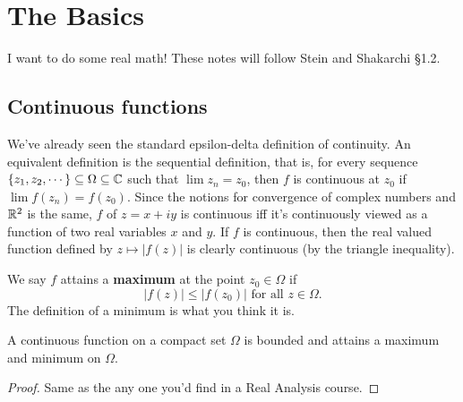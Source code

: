 \section{The Basics}
I want to do some real math! These notes will follow Stein and Shakarchi \S 1.2.
\subsection{Continuous functions}
We've already seen the standard epsilon-delta definition of continuity. An equivalent definition is the sequential definition, that is, for every sequence $\{z_1,z_2,\cdots\} \subseteq \Omega \subseteq \mathbb{C}$ such that $\lim z_n=z_0$, then $f$ is continuous at $z_0$ if $\lim f(z_n)=f(z_0)$. Since the notions for convergence of complex numbers and $\mathbb{R}^2$ is the same, $f$ of $z=x+iy$ is continuous iff it's continuously viewed as a function of two real variables $x$ and $y$. If $f$ is continuous, then the real valued function defined by $z\mapsto |f(z)|$ is clearly continuous (by the triangle inequality).

We say $f$ attains a \textbf{maximum} at the point $z_0\in \Omega$ if \[
    |f(z)|\leq |f(z_0)| \,\,\text{for all}\,\,  z\in \Omega.
\] The definition of a minimum is what you think it is.
\begin{theorem}
    A continuous function on a compact set $\Omega$ is bounded and attains a maximum and minimum on $\Omega$.
\end{theorem}
\begin{proof}
    Same as the any one you'd find in a Real Analysis course.
\end{proof}
